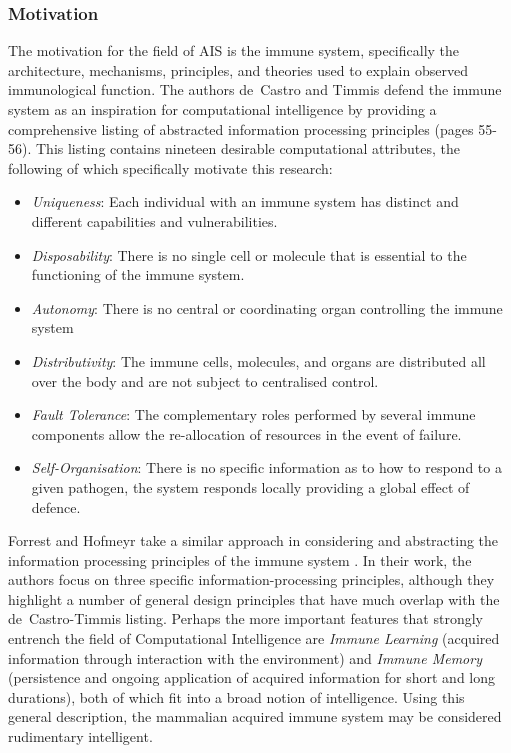 %
%
\subsubsection{Motivation}
The motivation for the field of AIS is the immune system, specifically the architecture, mechanisms, principles, and theories used to explain observed immunological function. The authors de~Castro and Timmis defend the immune system as an inspiration for computational intelligence by providing a comprehensive listing of abstracted information processing principles \cite{Castro2002b} (pages 55-56). This listing contains nineteen desirable computational attributes, the following of which specifically motivate this research:

\begin{itemize}
	\item \emph{Uniqueness}: Each individual with an immune system has distinct and different capabilities and vulnerabilities.
	\item \emph{Disposability}: There is no single cell or molecule that is essential to the functioning of the immune system.
	\item \emph{Autonomy}: There is no central or coordinating organ controlling the immune system
	\item \emph{Distributivity}: The immune cells, molecules, and organs are distributed all over the body and are not subject to centralised control.
	\item \emph{Fault Tolerance}: The complementary roles performed by several immune components allow the re-allocation of resources in the event of failure.
	\item \emph{Self-Organisation}: There is no specific information as to how to respond to a given pathogen, the system responds locally providing a global effect of defence.
\end{itemize}

Forrest and Hofmeyr take a similar approach in considering and abstracting the information processing principles of the immune system \cite{Forrest2001}. In their work, the authors focus on three specific information-processing principles, although they highlight a number of general design principles that have much overlap with the de~Castro-Timmis listing. Perhaps the more important features that strongly entrench the field of Computational Intelligence are \emph{Immune Learning} (acquired information through interaction with the environment) and \emph{Immune Memory} (persistence and ongoing application of acquired information for short and long durations), both of which fit into a broad notion of intelligence. Using this general description, the mammalian acquired immune system may be considered rudimentary intelligent. 

